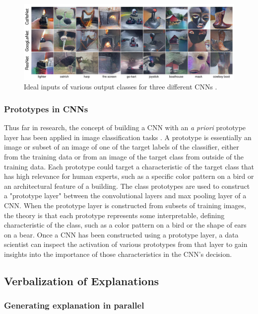 \begin{figure}
    \includegraphics[width=\textwidth]{media/nguyen2016.png}
    \caption{Ideal inputs of various output classes for three different CNNs \cite{Nguyen2016}.}
    \label{fig:nguyen2016}
\end{figure}

\subsubsection{Prototypes in CNNs}

Thus far in research, the concept of building a CNN with an \textit{a priori} prototype layer has been applied in image classification tasks \cite{Chen2018}.  A prototype is essentially an image or subset of an image of one of the target labels of the classifier, either from the training data or from an image of the target class from outside of the training data.  Each prototype could target a characteristic of the target class that has high relevance for human experts, such as a specific color pattern on a bird or an architectural feature of a building.  The class prototypes are used to construct a "prototype layer" between the convolutional layers and max pooling layer of a CNN.  When the prototype layer is constructed from subsets of training images, the theory is that each prototype represents some interpretable, defining characteristic of the class, such as a color pattern on a bird or the shape of ears on a bear.  Once a CNN has been constructed using a prototype layer, a data scientist can inspect the activation of various prototypes from that layer to gain insights into the importance of those characteristics in the CNN's decision.

\subsection{Verbalization of Explanations}

\subsubsection{Generating explanation in parallel}

